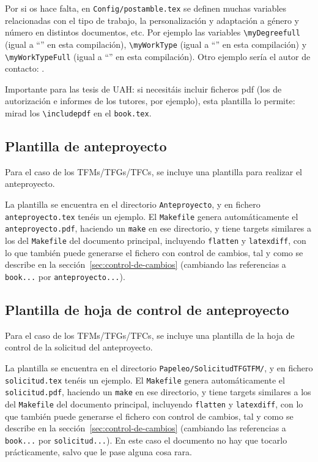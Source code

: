 {  Por si os hace falta, en \texttt{Config/postamble.tex} se definen muchas variables relacionadas con el tipo de trabajo, la personalización y adaptación a género y número en distintos documentos, etc. Por ejemplo las variables \texttt{\textbackslash{}myDegreefull} (igual a ``\myDegreefull'' en esta compilación), \texttt{\textbackslash{}myWorkType} (igual a ``\myWorkType'' en esta compilación) y \texttt{\textbackslash{}myWorkTypeFull} (igual a ``\myWorkTypeFull'' en esta compilación). Otro ejemplo sería el autor de contacto: \contactauthor.

  Importante para las tesis de UAH: si necesitáis incluir ficheros pdf (los de autorización e informes de los tutores, por ejemplo), esta plantilla lo permite: mirad los \texttt{\textbackslash{}includepdf} en el \texttt{book.tex}.

  \subsection{Plantilla de anteproyecto}
  \label{sec:plantilla-de-anteproyecto}

  Para el caso de los TFMs/TFGs/TFCs, se incluye una plantilla para realizar el anteproyecto.

  La plantilla se encuentra en el directorio \texttt{Anteproyecto}, y en fichero \texttt{anteproyecto.tex} tenéis un ejemplo. El \texttt{Makefile} genera automáticamente el \texttt{anteproyecto.pdf}, haciendo un \texttt{make} en ese directorio, y tiene targets similares a los del \texttt{Makefile} del documento principal, incluyendo \texttt{flatten} y \texttt{latexdiff}, con lo que también puede generarse el fichero con control de cambios, tal y como se describe en la sección~\ref{sec:control-de-cambios} (cambiando las referencias a \texttt{book...} por \texttt{anteproyecto...}).

  \subsection{Plantilla de hoja de control de anteproyecto}
  \label{sec:plantilla-de-hoja-control-anteproyecto}

  Para el caso de los TFMs/TFGs/TFCs, se incluye una plantilla de la hoja de control de la solicitud del anteproyecto.

  La plantilla se encuentra en el directorio \texttt{Papeleo/SolicitudTFGTFM/}, y en fichero \texttt{solicitud.tex} tenéis un ejemplo. El \texttt{Makefile} genera automáticamente el \texttt{solicitud.pdf}, haciendo un \texttt{make} en ese directorio, y tiene targets similares a los del \texttt{Makefile} del documento principal, incluyendo \texttt{flatten} y \texttt{latexdiff}, con lo que también puede generarse el fichero con control de cambios, tal y como se describe en la sección~\ref{sec:control-de-cambios} (cambiando las referencias a \texttt{book...} por \texttt{solicitud...}). En este caso el documento no hay que tocarlo prácticamente, salvo que le pase alguna cosa rara.


}

